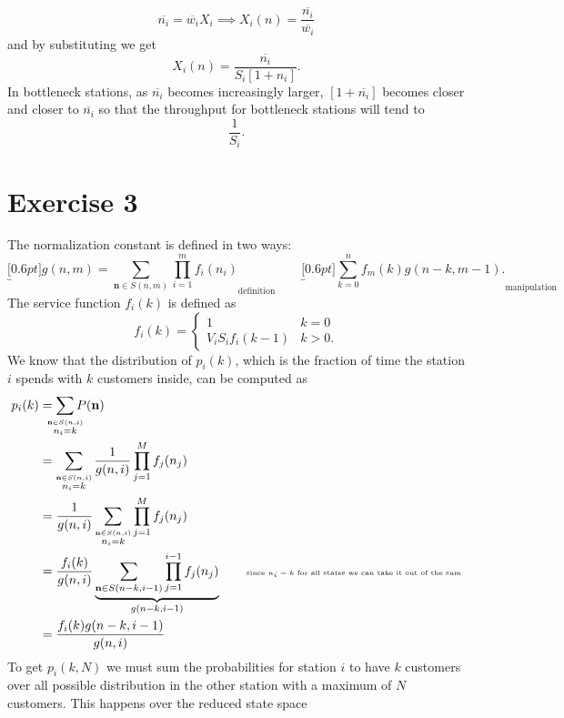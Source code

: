 \documentclass[12pt,a4paper]{article}
\begin{document}
	\begin{equation*}
		\overline{n_{i}}=\overline{w_i}X_i\implies X_i(n)=\frac{\overline{n_i}}{\overline{w_i}}
	\end{equation*}
	and by substituting we get
	\begin{equation*}
		X_i(n)=\frac{\overline{n_{i}}}{S_i[1+n_i]}.
	\end{equation*}
	In bottleneck stations, as $\overline{n_{i}}$ becomes increasingly larger, $[1+\overline{n_i}]$ becomes closer and closer to $\overline{n_{i}}$ so that the throughput for bottleneck stations will tend to
	\begin{equation*}
		\frac{1}{S_i}.
	\end{equation*}
	\section*{Exercise 3}
	The normalization constant is defined in two ways:
	\begin{equation*}
		\underbracket[0.6pt]{g(n,m)=\sum_{\mathbf{n}\in S(n,m)}\prod_{i=1}^{m}f_i(n_i)}_{\text{definition}}\qquad\underbracket[0.6pt]{\sum_{k=0}^{n}f_{m}(k)g(n-k,m-1).}_{\text{manipulation}}
	\end{equation*}
	The service function $f_i(k)$ is defined as
	\begin{equation*}
		f_{i}(k)=\begin{cases}
			1&k=0\\
			V_iS_if_i(k-1) &k>0.
		\end{cases}
	\end{equation*}
	We know that the distribution of $p_i(k)$, which is the fraction of time the station $i$ spends with $k$ customers inside, can be computed as
	\begin{align*}
		p_i(k)&=\sum_{\mathclap{\stackrel{\mathbf{n}\in S(n,i)}{n_i=k}}}P(\mathbf{n})\\
		&=\sum_{\stackrel{\mathbf{n}\in S(n,i)}{n_i=k}}\frac{1}{g(n,i)}\prod_{j=1}^{M}f_j(n_j)\\
		&=\frac{1}{g(n,i)}\sum_{\stackrel{\mathbf{n}\in S(n,i)}{n_i=k}}\prod_{j=1}^{M}f_j(n_j)\\
		&=\frac{f_i(k)}{g(n,i)}\underbrace{\sum_{\mathbf{n}\in S(n-k,i-1)}\prod_{j=1}^{i-1}f_j(n_j)}_{g(n-k,i-1)}\qquad\text{\tiny since $n_i=k$ for all states we can take it out of the sum}\\
		&=\frac{f_i(k)g(n-k,i-1)}{g(n,i)}
	\end{align*}
	To get $p_i(k,N)$ we must sum the probabilities for station $i$ to have $k$ customers over all possible distribution in the other station with a maximum of $N$ customers. This happens over the reduced state space 
\end{document}

